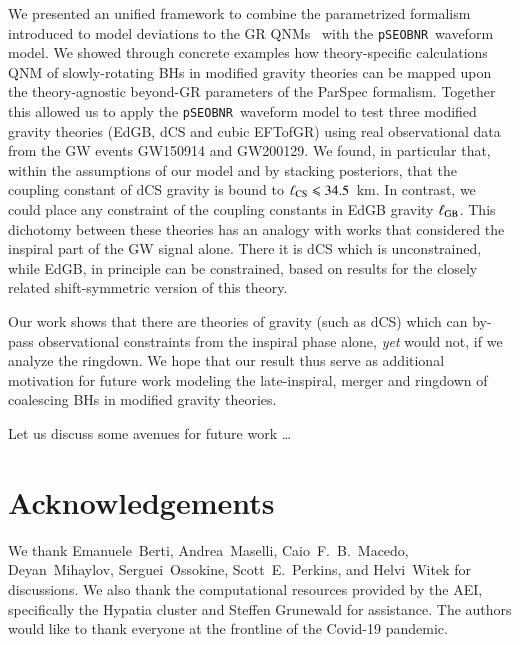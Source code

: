 \documentclass[twocolumn,
               prd,
               aps,
               superscriptaddress,
               tightenlines,
               nofootinbib,
               eqsecnum,
               amsfonts,
               amsmath,
               longbibliography]{revtex4-1}
\newcommand{\pSEOB}{\texttt{pSEOBNR}}
\newcommand{\hs}[1]{{\textcolor{blue}{{[HS: #1]}} }}
\begin{document}
We presented an unified framework to combine the parametrized formalism introduced
to model deviations to the GR QNMs~\cite{Maselli:2019mjd} with the \pSEOB~waveform model.
%
We showed through concrete examples how theory-specific calculations QNM of
slowly-rotating BHs in modified gravity theories can be mapped upon the
theory-agnostic beyond-GR parameters of the {\sc ParSpec} formalism.
%
Together this allowed us to apply the \pSEOB~waveform model to test three
modified gravity theories (EdGB, dCS and cubic EFTofGR) using real
observational data from the GW events GW150914 and GW200129.
%
We found, in particular that, within the assumptions of our model and by
stacking posteriors, that the coupling constant of dCS gravity is bound to
$\ell_{\rm CS} \leqslant 34.5$~km.
%
In contrast, we could place any constraint of the coupling constants in EdGB gravity $\ell_{\rm GB}$.
%
This dichotomy between these theories has an analogy with works that considered the inspiral part of the GW signal alone.
%
There it is dCS which is unconstrained, while EdGB, in principle can be constrained, based on results for the closely
related shift-symmetric version of this theory.

Our work shows that there are theories of gravity (such as dCS) which can by-pass observational
constraints from the inspiral phase alone, {\it yet} would not, if we
analyze the ringdown.
%
We hope that our result thus serve as additional motivation for future work
modeling the late-inspiral, merger and ringdown of coalescing BHs in modified
gravity theories.

Let us discuss some avenues for future work \dots


%


\section*{Acknowledgements}
\label{sec:acknowledgements}
%
We thank Emanuele~Berti, Andrea~Maselli, Caio~F.~B.~Macedo, Deyan~Mihaylov,
Serguei~Ossokine, Scott~E.~Perkins, and Helvi~Witek for discussions.
%
We also thank the computational resources provided by the AEI, specifically the
{\sc Hypatia} cluster and Steffen Grunewald for assistance.
%
The authors would like to thank everyone at the frontline of the Covid-19
pandemic.

% 

\end{document}
